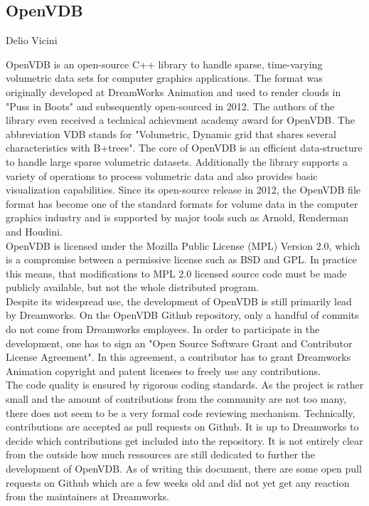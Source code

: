 \subsection{OpenVDB}{Delio Vicini}

OpenVDB is an open-source C++ library to handle sparse, time-varying volumetric data sets for computer graphics applications. The format was originally developed at DreamWorks Animation and used to render clouds in "Puss in Boots" and subsequently open-sourced in 2012.\cite{Museth.2013} The authors of the library even received a technical achievment academy award for OpenVDB.\cite{openvdb-about} The abbreviation VDB stands for "Volumetric, Dynamic grid that
shares several characteristics with B+trees".\cite{Museth.2013} The core of OpenVDB is an efficient data-structure to handle large sparse volumetric datasets. Additionally the library supports a variety of operations to process volumetric data and also provides basic visualization capabilities. Since its open-source release in 2012, the OpenVDB file format has become one of the standard formats for volume data in the computer graphics industry and is supported by major tools such as Arnold, Renderman and Houdini.\cite{openvdb-about} \\

OpenVDB is licensed under the Mozilla Public License (MPL) Version 2.0, which is a compromise between a permissive license such as BSD and GPL. In practice this means, that modifications to MPL 2.0 licensed source code must be made publicly available, but not the whole distributed program.\cite{mpl-faq} \\

Despite its widespread use, the development of OpenVDB is still primarily lead by Dreamworks. On the OpenVDB Github repository, only a handful of commits do not come from Dreamworks employees.\cite{openvdb-contribs} In order to participate in the development, one has to sign an "Open Source Software Grant and Contributor License Agreement".\cite{openvdb-agree} In this agreement, a contributor has to grant Dreamworks Animation copyright and patent licenses to freely use any contributions. \\

The code quality is ensured by rigorous coding standards.\cite{openvdb-code} As the project is rather small and the amount of contributions from the community are not too many, there does not seem to be a very formal code reviewing mechanism. Technically, contributions are accepted as pull requests on Github. It is up to Dreamworks to decide which contributions get included into the repository. It is not entirely clear from the outside how much ressources are still dedicated to further the development of OpenVDB. As of writing this document, there are some open pull requests on Github which are a few weeks old and did not yet get any reaction from the maintainers at Dreamworks.


